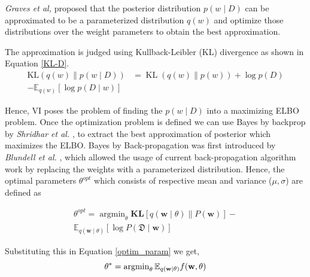 \documentclass[10pt,twocolumn,letterpaper]{article}
\begin{document}
\textit{Graves et al,} \cite{Graves2011} proposed that the posterior distribution $p(w \mid D)$ can be approximated to be a parameterized distribution $q(w)$ and optimize those distributions over the weight parameters to obtain the best approximation.
        
The approximation is judged using Kullback-Leibler (KL) divergence \cite{Kullback1959} as shown in Equation \ref{KL-D}.
    \begin{equation}
        \label{KL-D}
        \begin{aligned}
            \mathrm{KL}(q(w) \| p(w \mid D)) &=\operatorname{KL}(q(w) \| p(w))+\log p(D)\\ -\mathbb{E}_{q(w)}[\log p(D \mid w)]
        \end{aligned}
    \end{equation}

Hence, VI poses the problem of finding the $p(w \mid D)$ into a maximizing ELBO problem. Once the optimization problem is defined we can use Bayes by backprop by \textit{Shridhar et al.} \cite{shridhar2018uncertainty}, to extract the best approximation of posterior which maximizes the ELBO. Bayes by Back-propagation was first introduced by \textit{Blundell et al.} \cite{Blundell2015}, which allowed the usage of current back-propagation algorithm work by replacing the weights with a parameterized distribution. Hence, the optimal parameters $\theta^{opt}$ which consists of respective mean and variance ($\mu, \sigma$) are defined as  
        
\begin{equation}
\label{optim_param}
    \begin{aligned}
    \theta^{opt} =\operatorname{argmin}_{\theta} \mathbf{K L}[q(\mathbf{w} \mid \theta) \| P(\mathbf{w})]- \\ \mathbb{E}_{q(\mathbf{w} \mid \theta)}[\log P(\mathfrak{D} \mid \mathbf{w})]
    \end{aligned}
\end{equation}

        
Substituting this in Equation \ref{optim_param} we get, 
\begin{equation}
    \theta^{*}=\operatorname{argmin}_{\theta}\newline \mathbb{E}_{q(\mathbf{w} \mid \theta)} f(\mathbf{w}, \theta)
\end{equation}
\end{document}

